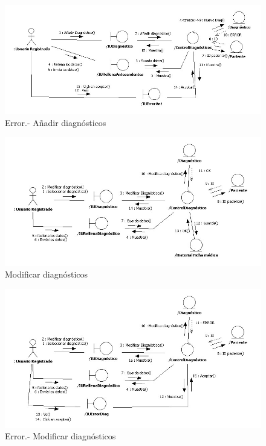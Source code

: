 \documentclass[a4paper,oneside,11pt]{book}
\begin{document}
			\begin{figure}[H]
			  \centering
			    \includegraphics[width=16cm]{img/jpg/colaboraciones/39_AnadirDiagnosticoError.jpg}
			  \caption{Error.- Añadir diagnósticos}
			  \label{fig:col_diag_fm_anadir_err}
			\end{figure}
			
			\begin{figure}[H]
			  \centering
			    \includegraphics[width=16cm]{img/jpg/colaboraciones/40_ModificarDiagnostico.jpg}
			  \caption{Modificar diagnósticos}
			  \label{fig:col_diag_fm_modificar}
			\end{figure}
			
			\begin{figure}[H]
			  \centering
			    \includegraphics[width=16cm]{img/jpg/colaboraciones/41_ModificarDiagnosticoError.jpg}
			  \caption{Error.- Modificar diagnósticos}
			  \label{fig:col_diag_fm_modificar_error}
			\end{figure}
			
\end{document}
